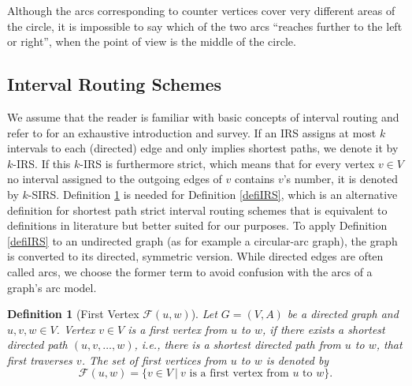\documentclass[10pt]{article}
\newtheorem{definition}[theorem]{Definition}
\newcommand{\q}[1]{``#1''}\newcommand{\fu}[1]{\mathcal{#1}}\newcommand{\mc}[1]{\mathsf{#1}}\newcommand{\ri}[1]{\mathscr{#1}}\newcommand{\co}[1]{\fu{C}({#1})}\newcommand{\lc}[1]{\alpha(#1)}\newcommand{\rc}[1]{\beta(#1)}\newcommand{\ema}[1]{\mathcal{#1}}\newcommand{\fe}[2]{\fu{F}(#1,#2)}\newcommand{\lv}[1]{l_{#1}}\newcommand{\rv}[1]{r_{#1}}\newcommand{\mv}[1]{m_{#1}}\newcommand{\lvv}{\lv{v}}
\begin{document}
Although the arcs corresponding to counter vertices 
cover very different areas of the circle, it is impossible to say 
which of the two arcs \q{reaches further to the left or right}, when the point of 
view is the middle of the circle.








\subsection{Interval Routing Schemes}\label{IRS}



We assume that the reader is familiar with basic concepts of interval routing and refer to \cite{Gavoille00asurvey} for an exhaustive introduction and survey.
If an IRS assigns at most $k$ intervals to each (directed) edge and only implies shortest paths, we denote it by $k$-IRS.
If this $k$-IRS is furthermore strict, which means that for every vertex $v\in V$ no interval assigned to the outgoing edges of $v$ contains $v$'s number, it is denoted by $k$-SIRS.
Definition \ref{fe} is needed for Definition \ref{defiIRS}, which is an alternative definition for shortest path strict interval routing schemes that is equivalent to definitions in literature but better suited for our purposes.
To apply Definition \ref{defiIRS} to an undirected graph (as for example a circular-arc graph), the graph is converted to its directed, symmetric version.
While directed edges are often called arcs, we choose the former term to avoid confusion with the arcs of a graph's arc model.























\begin{definition}[First Vertex $\fe{u}{w}$]\label{fe}
Let $G=(V,A)$ be a directed graph and $u,v,w\in V$.
Vertex $v\in V$ is a \emph{first vertex from $u$ to $w$}, if there exists a shortest directed path 
$(u,v,\ldots, w)$, i.e., there is a shortest directed path from $u$ to $w$, that first traverses $v$.
The set of first vertices from $u$ to $w$ is denoted by 
$$\fe{u}{w}=\{v\in V~|~v\text{ is a first vertex from }u\text{ to }w\}.$$
\end{definition}
\end{document}
